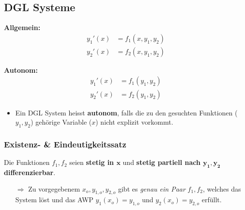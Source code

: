 \subsection{DGL Systeme}
    \vspace{0.5em}
    \begin{minipage}{0.5\linewidth}
        \centering
        \textbf{Allgemein:}
        \begin{align*}
            y_1'(x) &= f_1(x,y_1,y_2)\\
            y_2'(x) &= f_2(x,y_1,y_2)
        \end{align*}
    \end{minipage}
    \begin{minipage}{0.49\linewidth}
        \centering
        \textbf{Autonom:}
        \begin{align*}
            y_1'(x) &= f_1(y_1,y_2)\\
            y_2'(x) &= f_2(y_1,y_2)
        \end{align*}
    \end{minipage}
    \vspace{0.5em}
    \begin{itemize}
        \item Ein DGL System heisst \textbf{autonom}, falls die zu den gesuchten Funktionen ($y_1, y_2$) gehörige Variable ($x$) nicht explizit vorkommt.
    \end{itemize}

    \subsubsection{Existenz- \& Eindeutigkeitssatz}
        Die Funktionen $f_1,f_2$ seien \textbf{stetig in $\boldsymbol{x}$} und \textbf{stetig partiell nach $\boldsymbol{y_1,y_2}$ differenzierbar}.
        \begin{itemize}
            \item[$\Rightarrow$] Zu vorgegebenem $x_o, y_{1,o}, y_{2,o}$ gibt es \textit{genau ein Paar} $f_1,f_2$, welches das System löst und das AWP $y_1(x_o) = y_{1,o}$ und $y_2(x_o) = y_{2,o}$ erfüllt.
        \end{itemize}
